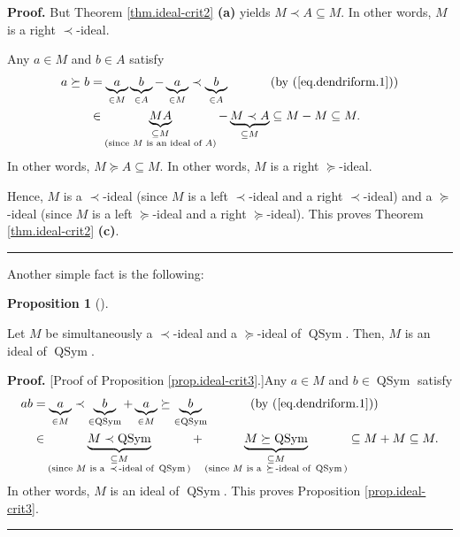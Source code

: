 \documentclass[numbers=enddot,12pt,final,onecolumn,notitlepage]{scrartcl}%
\theoremstyle{definition}
\newtheorem{prop}[theo]{Proposition}
\newenvironment{proposition}[1][]
{\begin{prop}[#1]\begin{leftbar}}
{\end{leftbar}\end{prop}}
\newenvironment{proof}[1][Proof]{\noindent\textbf{#1.} }{\ \rule{0.5em}{0.5em}}
\begin{document}
\begin{proof}
But Theorem \ref{thm.ideal-crit2} \textbf{(a)} yields $M\left.  \prec\right.
A\subseteq M$. In other words, $M$ is a right $\left.  \prec\right.  $-ideal.

Any $a\in M$ and $b\in A$ satisfy%
\begin{align*}
a\left.  \succeq\right.  b  &  =\underbrace{a}_{\in M}\underbrace{b}_{\in
A}-\underbrace{a}_{\in M}\left.  \prec\right.  \underbrace{b}_{\in
A}\ \ \ \ \ \ \ \ \ \ \left(  \text{by (\ref{eq.dendriform.1})}\right) \\
&  \in\underbrace{MA}_{\substack{\subseteq M\\\text{(since }M\text{ is an
ideal of }A\text{)}}}-\underbrace{M\left.  \prec\right.  A}_{\subseteq
M}\subseteq M-M\subseteq M.
\end{align*}
In other words, $M\left.  \succeq\right.  A\subseteq M$. In other words, $M$
is a right $\left.  \succeq\right.  $-ideal.

Hence, $M$ is a $\left.  \prec\right.  $-ideal (since $M$ is a left $\left.
\prec\right.  $-ideal and a right $\left.  \prec\right.  $-ideal) and a
$\left.  \succeq\right.  $-ideal (since $M$ is a left $\left.  \succeq\right.
$-ideal and a right $\left.  \succeq\right.  $-ideal). This proves Theorem
\ref{thm.ideal-crit2} \textbf{(c)}.
\end{proof}

Another simple fact is the following:

\begin{proposition}
\label{prop.ideal-crit3}Let $M$ be simultaneously a $\left.  \prec\right.
$-ideal and a $\left.  \succeq\right.  $-ideal of $\operatorname*{QSym}$.
Then, $M$ is an ideal of $\operatorname*{QSym}$.
\end{proposition}

\begin{proof}
[Proof of Proposition \ref{prop.ideal-crit3}.]Any $a\in M$ and $b\in
\operatorname*{QSym}$ satisfy%
\begin{align*}
ab  &  =\underbrace{a}_{\in M}\left.  \prec\right.  \underbrace{b}%
_{\in\operatorname*{QSym}}+\underbrace{a}_{\in M}\left.  \succeq\right.
\underbrace{b}_{\in\operatorname*{QSym}}\ \ \ \ \ \ \ \ \ \ \left(  \text{by
(\ref{eq.dendriform.1})}\right) \\
&  \in\underbrace{M\left.  \prec\right.  \operatorname*{QSym}}%
_{\substack{\subseteq M\\\text{(since }M\text{ is a }\left.  \prec\right.
\text{-ideal of }\operatorname*{QSym}\text{)}}}+\underbrace{M\left.
\succeq\right.  \operatorname*{QSym}}_{\substack{\subseteq M\\\text{(since
}M\text{ is a }\left.  \succeq\right.  \text{-ideal of }\operatorname*{QSym}%
\text{)}}}\subseteq M+M\subseteq M.
\end{align*}
In other words, $M$ is an ideal of $\operatorname*{QSym}$. This proves
Proposition \ref{prop.ideal-crit3}.
\end{proof}
\end{document}
